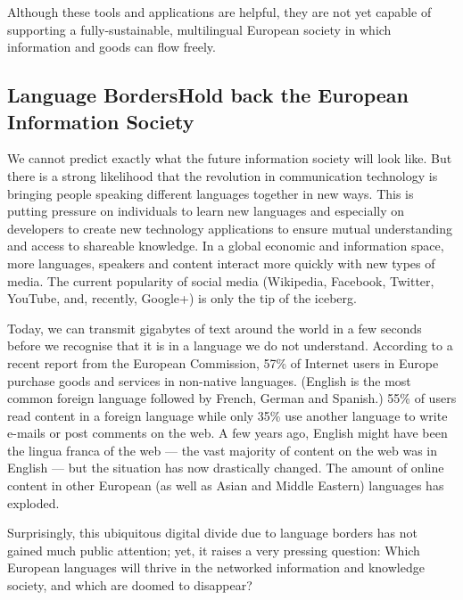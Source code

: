 \begin{multicols}{2}
Although these tools and applications are helpful, they are not yet capable of supporting a fully-sustainable, multilingual European society in which information and goods can flow freely.

\subsection[Language Borders Hold back the European Information Society]{Language Borders\newline Hold back the European Information Society}

We cannot predict exactly what the future information society will look like. But there is a strong likelihood that the revolution in communication technology is bringing people speaking different languages together in new ways. This is putting pressure on individuals to learn new languages and especially on developers to create new technology applications to ensure mutual understanding and access to shareable knowledge. In a global economic and information space, more languages, speakers and content interact more quickly with new types of media. The current popularity of social media (Wikipedia, Facebook, Twitter, YouTube, and, recently, Google+) is only the tip of the iceberg.


Today, we can transmit gigabytes of text around the world in a few seconds before we recognise that it is in a language we do not understand. According to a recent report from the European Commission, 57\% of Internet users in Europe purchase goods and services in non-native languages. (English is the most common foreign language followed by French, German and Spanish.) 55\% of users read content in a foreign language while only 35\% use another language to write e-mails or post comments on the web\cite{EC1}. A few years ago, English might have been the lingua franca of the web — the vast majority of content on the web was in English — but the situation has now drastically changed. The amount of online content in other European (as well as Asian and Middle Eastern) languages has exploded.

Surprisingly, this ubiquitous digital divide due to language borders has not gained much public attention; yet, it raises a very pressing question: Which European languages will thrive in the networked information and knowledge society, and which are doomed to disappear?


\end{multicols}
